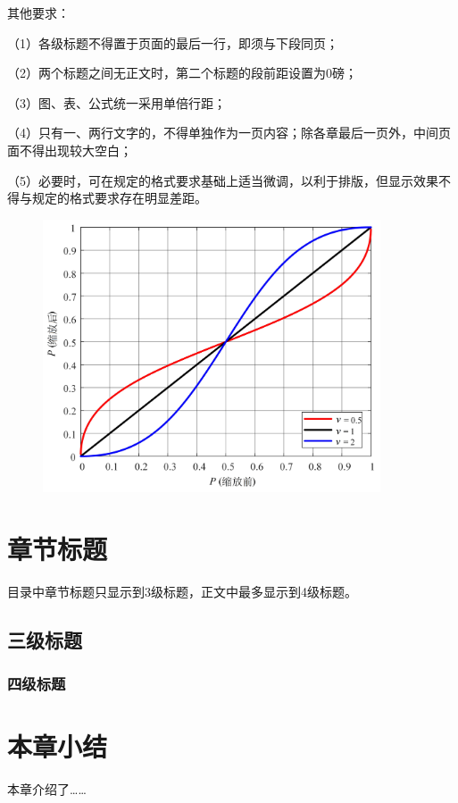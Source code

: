 其他要求：

（1）各级标题不得置于页面的最后一行，即须与下段同页；

（2）两个标题之间无正文时，第二个标题的段前距设置为0磅；

（3）图、表、公式统一采用单倍行距；

（4）只有一、两行文字的，不得单独作为一页内容；除各章最后一页外，中间页面不得出现较大空白；

（5）必要时，可在规定的格式要求基础上适当微调，以利于排版，但显示效果不得与规定的格式要求存在明显差距。

\vspace{-0.15cm}

\begin{figure}[h]
	\centering 
	\includegraphics[width=10cm]{chapters/31}
	\label{fig:2.1}
\end{figure}

\vspace{-0.5cm}

\section{章节标题}
目录中章节标题只显示到3级标题，正文中最多显示到4级标题。

\subsection{三级标题}

\vspace{0.5cm}

\subsubsection{四级标题}

\vspace{0.3cm}



\section{本章小结}
本章介绍了……




